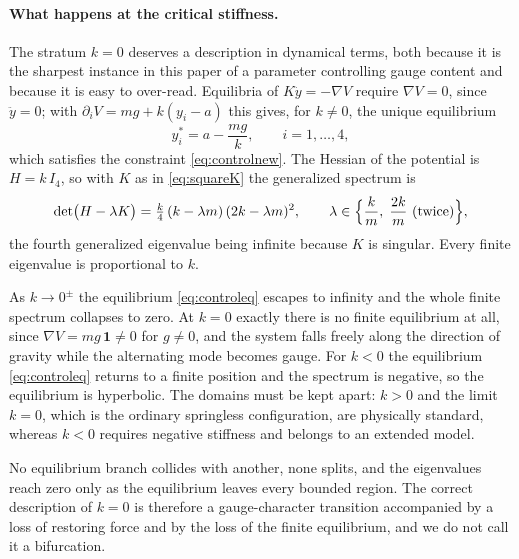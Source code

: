 \documentclass[12pt]{article}
\theoremstyle{plain}
\theoremstyle{definition}
\theoremstyle{remark}
\newcommand{\pd}[1]{\partial_{#1}}
\begin{document}
	\paragraph{What happens at the critical stiffness.} The stratum $k=0$ deserves
	a description in dynamical terms, both because it is the sharpest instance in
	this paper of a parameter controlling gauge content and because it is easy to
	over-read. Equilibria of $K\ddot y=-\nabla V$ require $\nabla V=0$, since
	$\ddot y=0$; with $\pd{i}V=mg+k(y_{i}-a)$ this gives, for $k\neq0$, the unique
	equilibrium
	\begin{equation}
		y_{i}^{*}=a-\frac{mg}{k},
		\qquad i=1,\dots,4,
		\label{eq:controleq}
	\end{equation}
	which satisfies the constraint \eqref{eq:controlnew}. The Hessian of the
	potential is $H=k\,I_{4}$, so with $K$ as in \eqref{eq:squareK} the generalized
	spectrum is
	\begin{equation}
		\det\bigl(H-\lambda K\bigr)
		=\tfrac{k}{4}\,(k-\lambda m)\,(2k-\lambda m)^{2},
		\qquad
		\lambda\in\Bigl\{\frac{k}{m},\;\frac{2k}{m}\ \text{(twice)}\Bigr\},
		\label{eq:controlspec}
	\end{equation}
	the fourth generalized eigenvalue being infinite because $K$ is singular. Every
	finite eigenvalue is proportional to $k$.
	
	As $k\to0^{\pm}$ the equilibrium \eqref{eq:controleq} escapes to infinity and
	the whole finite spectrum collapses to zero. At $k=0$ exactly there is no
	finite equilibrium at all, since $\nabla V=mg\,\mathbf{1}\neq0$ for $g\neq0$,
	and the system falls freely along the direction of gravity while the
	alternating mode becomes gauge. For $k<0$ the equilibrium \eqref{eq:controleq}
	returns to a finite position and the spectrum is negative, so the equilibrium
	is hyperbolic. The domains must be kept apart: $k>0$ and the limit $k=0$, which
	is the ordinary springless configuration, are physically standard, whereas
	$k<0$ requires negative stiffness and belongs to an extended model.
	
	No equilibrium branch collides with another, none splits, and the eigenvalues
	reach zero only as the equilibrium leaves every bounded region. The correct
	description of $k=0$ is therefore a gauge-character transition accompanied by a
	loss of restoring force and by the loss of the finite equilibrium, and we do
	not call it a bifurcation.
	
\end{document}
